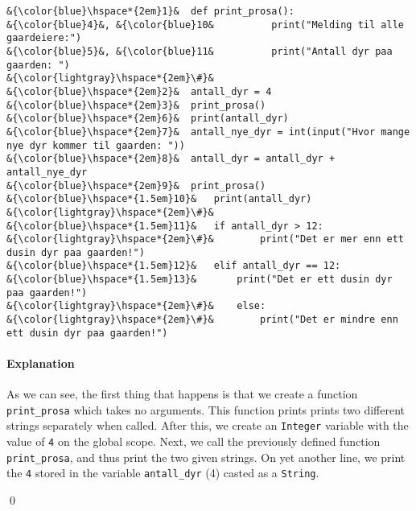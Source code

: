 \documentclass{myassignment}
\date{1. September 2019}
\renewenvironment{answer}%
{%
\vspace{0.1 in}
\begin{boldmath}
\begin{emph}
{%
}
}%
{%
\end{emph}
\end{boldmath}
\qed
}
\begin{document}

	\begin{answer}
	\begin{lstlisting}[style=custompython]
&{\color{blue}\hspace*{2em}1}&	def print_prosa():
&{\color{blue}4}&, &{\color{blue}10&		  print("Melding til alle gaardeiere:")
&{\color{blue}5}&, &{\color{blue}11&		  print("Antall dyr paa gaarden: ")
&{\color{lightgray}\hspace*{2em}\#}&
&{\color{blue}\hspace*{2em}2}&	antall_dyr = 4
&{\color{blue}\hspace*{2em}3}&	print_prosa()
&{\color{blue}\hspace*{2em}6}&	print(antall_dyr)
&{\color{blue}\hspace*{2em}7}&	antall_nye_dyr = int(input("Hvor mange nye dyr kommer til gaarden: "))
&{\color{blue}\hspace*{2em}8}&	antall_dyr = antall_dyr + antall_nye_dyr
&{\color{blue}\hspace*{2em}9}&	print_prosa()
&{\color{blue}\hspace*{1.5em}10}&	print(antall_dyr)
&{\color{lightgray}\hspace*{2em}\#}&
&{\color{blue}\hspace*{1.5em}11}&	if antall_dyr > 12:
&{\color{lightgray}\hspace*{2em}\#}&		print("Det er mer enn ett dusin dyr paa gaarden!")
&{\color{blue}\hspace*{1.5em}12}&	elif antall_dyr == 12:
&{\color{blue}\hspace*{1.5em}13}&	 	print("Det er ett dusin dyr paa gaarden!")
&{\color{lightgray}\hspace*{2em}\#}&	else:
&{\color{lightgray}\hspace*{2em}\#}&		print("Det er mindre enn ett dusin dyr paa gaarden!")
	\end{lstlisting}
\paragraph{Explanation}As we can see, the first thing that happens is that we create a function \texttt{print\_prosa} which takes no arguments. This function prints prints two different strings separately when called. After this, we create an \texttt{Integer} variable with the value of \texttt{4} on the global scope. Next, we call the previously defined function \texttt{print\_prosa}, and thus print the two given strings. On yet another line, we print the \texttt{4} stored in the variable \texttt{antall\_dyr} (4) casted as a \texttt{String}.


\end{answer}
\end{document}
